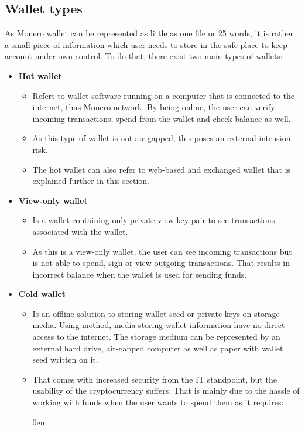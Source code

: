 \documentclass[
  printed, %
  table,   %
  nolof,     %
  nolot,     %
           oneside, color
]{fithesis3}
\begin{document}
\subsection{Wallet types}
\label{sec:wallettypes}
As Monero wallet can be represented as little as one file or 25 words, it is rather a small piece of information which user needs to store in the safe place to keep account under own control. To do that, there exist two main types of wallets:
\begin{itemize}\itemsep0em
\item \textbf{Hot wallet}
\begin{itemize}\itemsep0em
\item Refers to wallet software running on a computer that is connected to the internet, thus Monero network. By being online, the user can verify incoming transactions, spend from the wallet and check balance as well.
\item As this type of wallet is not air-gapped, this poses an external intrusion risk.
\item The hot wallet can also refer to web-based and exchanged wallet that is explained further in this section.
\end{itemize}
\item \textbf{View-only wallet}
\begin{itemize}\itemsep0em
\item Is a wallet containing only private view key pair to see transactions associated with the wallet.
\item As this is a view-only wallet, the user can see incoming transactions but is not able to spend, sign or view outgoing transactions. That results in incorrect balance when the wallet is used for sending funds.
\end{itemize}
\item \textbf{Cold wallet}
\begin{itemize}\itemsep0em
\item Is an offline solution to storing wallet seed or private keys on storage media. Using method, media storing wallet information have no direct access to the internet. The storage medium can be represented by an external hard drive, air-gapped computer as well as paper with wallet seed written on it.
\item That comes with increased security from the IT standpoint, but the usability of the cryptocurrency suffers. That is mainly due to the hassle of working with funds when the user wants to spend them as it requires:
\begin{itemize}\itemsep0em

\end{itemize}
\end{itemize}
\end{itemize}
\end{document}
